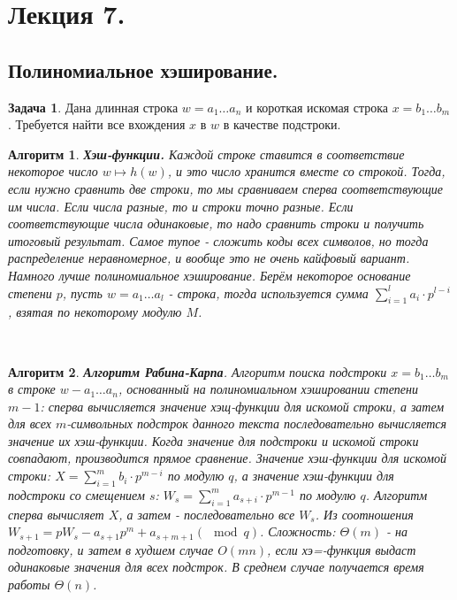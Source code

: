 \documentclass[a4paper]{article}
\theoremstyle{indented}
\newtheorem{alg}{Алгоритм}
\theoremstyle{definition}
\newtheorem{prob}{Задача}
\theoremstyle{remark}
\begin{document}
\section{Лекция 7.}

\subsection{Полиномиальное хэширование.}

\begin{prob}
    Дана длинная строка $w=a_1\ldots a_n$ и короткая искомая строка $x=b_1\ldots b_m$. Требуется найти все вхождения $x$ в $w$ в качестве подстроки.
\end{prob}

\begin{alg}
    \textbf{Хэш-функции.} Каждой строке ставится в соответствие некоторое число $w\mapsto h(w)$, и это число хранится вместе со строкой. Тогда, если нужно сравнить две строки, то мы сравниваем сперва соответствующие им числа. Если числа разные, то и строки точно разные. Если соответствующие числа одинаковые, то надо сравнить строки и получить итоговый результат. Самое тупое - сложить коды всех символов, но тогда распределение неравномерное, и вообще это не очень кайфовый вариант. Намного лучше \textit{полиномиальное хэширование}. Берём некоторое основание степени $p$, пусть $w=a_1\ldots a_l$ - строка, тогда используется сумма $\sum_{i=1}^l a_i\cdot p^{l-i}$, взятая по некоторому модулю $M$.
\end{alg} \

\begin{alg}
    \textbf{Алгоритм Рабина-Карпа}. Алгоритм поиска подстроки $x=b_1\ldots b_m$ в строке $w-a_1\ldots a_n$, основанный на полиномиальном хэшировании степени $m-1$: сперва вычисляется значение хэщ-функции для искомой строки, а затем для всех $m$-символьных подстрок данного текста последовательно вычисляется значение их хэш-функции. Когда значение для подстроки и искомой строки совпадают, производится прямое сравнение. Значение хэш-функции для искомой строки: $X=\sum_{i=1}^m b_i\cdot p^{m-i}$ по модулю $q$, а значение хэш-функции для подстроки со смещением $s$: $W_s=\sum_{i=1}^m a_{s+i}\cdot p^{m-1}$ по модулю $q$. Алгоритм сперва вычисляет $X$, а затем - последовательно все $W_s$. Из соотношения $W_{s+1}=pW_s-a_{s+1}p^m+a_{s+m+1}(\mod{q})$. Сложность: $\Theta(m)$ - на подготовку, и затем в худшем случае $O(mn)$, если хэ=-функция выдаст одинаковые значения для всех подстрок. В среднем случае получается время работы $\Theta(n)$. 
\end{alg}
\end{document}
